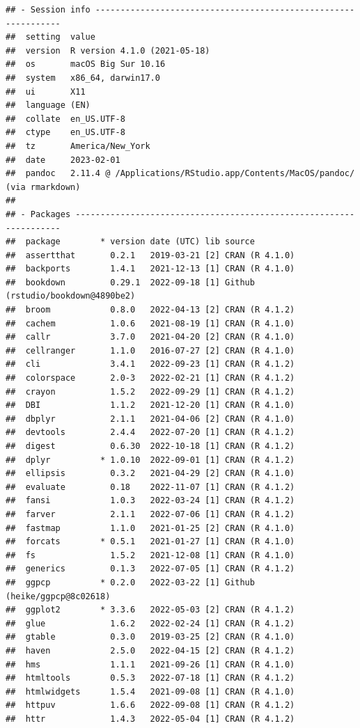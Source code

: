 \documentclass[print]{nuthesis}
\begin{document}
\begin{verbatim}
## - Session info ---------------------------------------------------------------
##  setting  value
##  version  R version 4.1.0 (2021-05-18)
##  os       macOS Big Sur 10.16
##  system   x86_64, darwin17.0
##  ui       X11
##  language (EN)
##  collate  en_US.UTF-8
##  ctype    en_US.UTF-8
##  tz       America/New_York
##  date     2023-02-01
##  pandoc   2.11.4 @ /Applications/RStudio.app/Contents/MacOS/pandoc/ (via rmarkdown)
## 
## - Packages -------------------------------------------------------------------
##  package        * version date (UTC) lib source
##  assertthat       0.2.1   2019-03-21 [2] CRAN (R 4.1.0)
##  backports        1.4.1   2021-12-13 [1] CRAN (R 4.1.0)
##  bookdown         0.29.1  2022-09-18 [1] Github (rstudio/bookdown@4890be2)
##  broom            0.8.0   2022-04-13 [2] CRAN (R 4.1.2)
##  cachem           1.0.6   2021-08-19 [1] CRAN (R 4.1.0)
##  callr            3.7.0   2021-04-20 [2] CRAN (R 4.1.0)
##  cellranger       1.1.0   2016-07-27 [2] CRAN (R 4.1.0)
##  cli              3.4.1   2022-09-23 [1] CRAN (R 4.1.2)
##  colorspace       2.0-3   2022-02-21 [1] CRAN (R 4.1.2)
##  crayon           1.5.2   2022-09-29 [1] CRAN (R 4.1.2)
##  DBI              1.1.2   2021-12-20 [1] CRAN (R 4.1.0)
##  dbplyr           2.1.1   2021-04-06 [2] CRAN (R 4.1.0)
##  devtools         2.4.4   2022-07-20 [1] CRAN (R 4.1.2)
##  digest           0.6.30  2022-10-18 [1] CRAN (R 4.1.2)
##  dplyr          * 1.0.10  2022-09-01 [1] CRAN (R 4.1.2)
##  ellipsis         0.3.2   2021-04-29 [2] CRAN (R 4.1.0)
##  evaluate         0.18    2022-11-07 [1] CRAN (R 4.1.2)
##  fansi            1.0.3   2022-03-24 [1] CRAN (R 4.1.2)
##  farver           2.1.1   2022-07-06 [1] CRAN (R 4.1.2)
##  fastmap          1.1.0   2021-01-25 [2] CRAN (R 4.1.0)
##  forcats        * 0.5.1   2021-01-27 [1] CRAN (R 4.1.0)
##  fs               1.5.2   2021-12-08 [1] CRAN (R 4.1.0)
##  generics         0.1.3   2022-07-05 [1] CRAN (R 4.1.2)
##  ggpcp          * 0.2.0   2022-03-22 [1] Github (heike/ggpcp@8c02618)
##  ggplot2        * 3.3.6   2022-05-03 [2] CRAN (R 4.1.2)
##  glue             1.6.2   2022-02-24 [1] CRAN (R 4.1.2)
##  gtable           0.3.0   2019-03-25 [2] CRAN (R 4.1.0)
##  haven            2.5.0   2022-04-15 [2] CRAN (R 4.1.2)
##  hms              1.1.1   2021-09-26 [1] CRAN (R 4.1.0)
##  htmltools        0.5.3   2022-07-18 [1] CRAN (R 4.1.2)
##  htmlwidgets      1.5.4   2021-09-08 [1] CRAN (R 4.1.0)
##  httpuv           1.6.6   2022-09-08 [1] CRAN (R 4.1.2)
##  httr             1.4.3   2022-05-04 [1] CRAN (R 4.1.2)

\end{verbatim}
\end{document}
